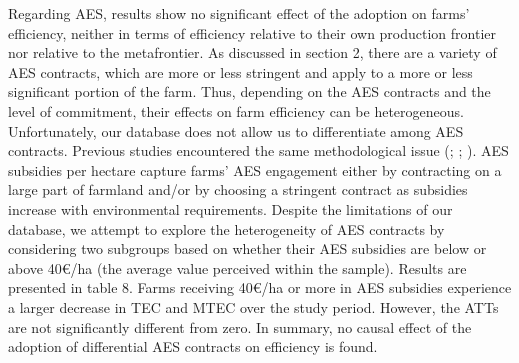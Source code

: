 \begin{Article}
\begin{refsection}[Lassalas]
Regarding AES, results show no significant effect of the adoption on
farms' efficiency, neither in terms of efficiency relative to their own
production frontier nor relative to the metafrontier. As discussed in
section 2, there are a variety of AES contracts, which are more or less
stringent and apply to a more or less significant portion of the farm.
Thus, depending on the AES contracts and the level of commitment, their
effects on farm efficiency can be heterogeneous. Unfortunately, our
database does not allow us to differentiate among AES contracts.
Previous studies encountered the same methodological issue (\textcite{barath2020effect}; \textcite{mennig_sauer_2020}; \textcite{dakpo_latruffe_desjeux_jeanneaux_2022}). AES subsidies per hectare capture farms' AES
engagement either by contracting on a large part of farmland and/or by
choosing a stringent contract as subsidies increase with environmental
requirements. Despite the limitations of our database, we attempt to
explore the heterogeneity of AES contracts by considering two subgroups
based on whether their AES subsidies are below or above 40€/ha (the
average value perceived within the sample). Results are presented in
table 8. Farms receiving 40€/ha or more in AES subsidies experience a
larger decrease in TEC and MTEC over the study period. However, the ATTs
are not significantly different from zero. In summary, no causal effect
of the adoption of differential AES contracts on efficiency is found.


\end{refsection}
\end{Article}
